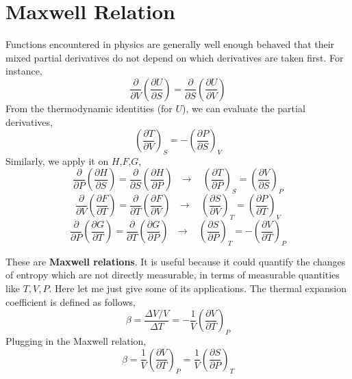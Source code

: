 \section{Maxwell Relation}
Functions encountered in physics are generally well enough behaved that their
mixed partial derivatives do not depend on which derivatives are taken first. For instance,
\begin{equation} 
                 \frac {\partial}{\partial V} (\frac{\partial U}{\partial S}) 
               = \frac {\partial}{\partial S} (\frac{\partial U}{\partial V})
\end{equation}
From the thermodynamic identities (for $U$), we can evaluate the partial derivatives,
\begin{equation} 
               (\frac{\partial T}{\partial V})_S
               = -(\frac{\partial P}{\partial S})_V
\end{equation}
Similarly, we apply it on $H$,$F$,$G$,
\begin{equation} \frac {\partial}{\partial P} (\frac{\partial H}{\partial S}) 
               = \frac {\partial}{\partial S} (\frac{\partial H}{\partial P})
               ~~~ \rightarrow ~~~~
                (\frac{\partial T}{\partial P})_S
               = (\frac{\partial V}{\partial S})_P
\end{equation}
\begin{equation} \frac {\partial}{\partial V} (\frac{\partial F}{\partial T}) 
               = \frac {\partial}{\partial T} (\frac{\partial F}{\partial V})
               ~~~ \rightarrow ~~~~
                (\frac{\partial S}{\partial V})_T
               = (\frac{\partial P}{\partial T})_V
\end{equation}
\begin{equation} \frac {\partial}{\partial P} (\frac{\partial G}{\partial T}) 
               = \frac {\partial}{\partial T} (\frac{\partial G}{\partial P})
               ~~~ \rightarrow ~~~~
                (\frac{\partial S}{\partial P})_T
               = -(\frac{\partial V}{\partial T})_P
\end{equation}

These are {\bf Maxwell relations}. It is useful because it could quantify the changes of 
entropy which are not directly measurable, in terms of measurable quantities like $T,V,P$.
Here let me just give some of its applications.
The thermal expansion coefficient is defined as follows,
\begin{equation}
\beta = \frac{\Delta{V}/V}{\Delta{T}} = -\frac{1}{V}(\frac{\partial V}{\partial T})_P
\end{equation}
Plugging in the Maxwell relation,
\begin{equation}
\beta = \frac{1}{V}(\frac{\partial V}{\partial T})_P 
      = \frac{1}{V}(\frac{\partial S}{\partial P})_T 
\end{equation}

